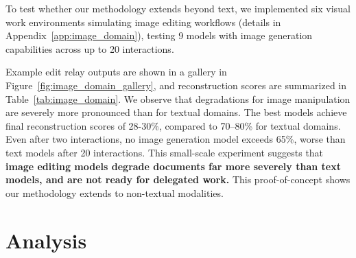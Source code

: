 \documentclass{article} %
\begin{document}
To test whether our methodology extends beyond text, we implemented six visual work environments simulating image editing workflows (details in Appendix~\ref{app:image_domain}), testing 9 models with image generation capabilities across up to 20 interactions.

Example edit relay outputs are shown in a gallery in Figure~\ref{fig:image_domain_gallery}, and reconstruction scores are summarized in Table~\ref{tab:image_domain}. We observe that degradations for image manipulation are severely more pronounced than for textual domains. The best models achieve final reconstruction scores of 28-30\%, compared to 70--80\% for textual domains. Even after two interactions, no image generation model exceeds 65\%, worse than text models after 20 interactions. This small-scale experiment suggests that \textbf{image editing models degrade documents far more severely than text models, and are not ready for delegated work.} This proof-of-concept shows our methodology extends to non-textual modalities.

\section{Analysis} \label{sec:understanding_degradation}

\begin{table}
    \vspace{-8\intextsep}
    
    \vspace{-0.4\intextsep}
    \caption{Critical error analysis: cumulative \% of runs with at least one critical error ($\geq$10pt drop) by interaction, and share of total degradation from critical errors.}
    \label{tab:critical_errors_main}
    \vspace{-1\intextsep}
\end{table}
\end{document}
